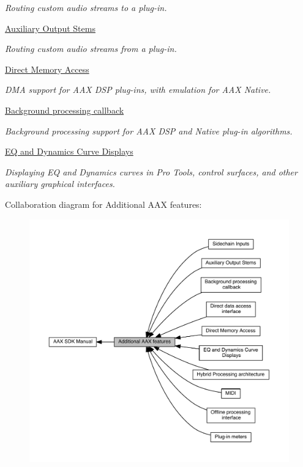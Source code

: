\begin{DoxyCompactItemize}
\begin{DoxyCompactList}\small\item\em Routing custom audio streams to a plug-\/in. \end{DoxyCompactList}\item 
\hyperlink{a00339}{Auxiliary Output Stems}
\begin{DoxyCompactList}\small\item\em Routing custom audio streams from a plug-\/in. \end{DoxyCompactList}\item 
\hyperlink{a00340}{Direct Memory Access}
\begin{DoxyCompactList}\small\item\em D\+M\+A support for A\+A\+X D\+S\+P plug-\/ins, with emulation for A\+A\+X Native. \end{DoxyCompactList}\item 
\hyperlink{a00341}{Background processing callback}
\begin{DoxyCompactList}\small\item\em Background processing support for A\+A\+X D\+S\+P and Native plug-\/in algorithms. \end{DoxyCompactList}\item 
\hyperlink{a00342}{E\+Q and Dynamics Curve Displays}
\begin{DoxyCompactList}\small\item\em Displaying E\+Q and Dynamics curves in Pro Tools, control surfaces, and other auxiliary graphical interfaces. \end{DoxyCompactList}\end{DoxyCompactItemize}
Collaboration diagram for Additional A\+A\+X features\+:
\nopagebreak
\begin{figure}[H]
\begin{center}
\leavevmode
\includegraphics[width=350pt]{a00332}
\end{center}
\end{figure}
